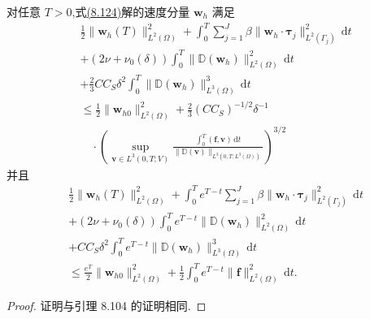 \begin{theorem}[对 $\nu$ 一致的稳定性估计]
\label{thm:smagorinsky-fem-uniform-stability}
对任意 $T>0$,式\hyperref[eq:smagorinsky-continuous-time-fem-problem]{(8.124)}解的速度分量 $\bm{w}_h$ 满足
\begin{equation}\label{eq:smagorinsky-fem-uniform-stability}
\begin{aligned}
 &\frac12\|\bm{w}_h(T)\|_{L^2(\Omega)}^2
 +\int_0^T\sum_{j=1}^J\beta
       \|\bm{w}_h\cdot\symbf{\tau}_j\|_{L^2(\Gamma_j)}^2\,\mathrm{d}t\\
 &+(2\nu+\nu_0(\delta))\int_0^T
       \|\mathbb{D}(\bm{w}_h)\|_{L^2(\Omega)}^2\,\mathrm{d}t\\
 &+\frac23 C C_S\delta^2\int_0^T
       \|\mathbb{D}(\bm{w}_h)\|_{L^3(\Omega)}^3\,\mathrm{d}t\\
 &\le \frac12\|\bm{w}_{h0}\|_{L^2(\Omega)}^2
       +\frac23(CC_S)^{-1/2}\delta^{-1}\\
 &\quad\cdot\left(\sup_{\bm{v}\in L^3(0,T;V)}
       \frac{\int_0^T(\bm{f},\bm{v})\,\mathrm{d}t}
       {\|\mathbb{D}(\bm{v})\|_{L^3(0,T;L^3(\Omega))}}\right)^{3/2}
\end{aligned}
\end{equation}
并且
\begin{equation}\label{eq:smagorinsky-fem-weighted-stability}
\begin{aligned}
 &\frac12\|\bm{w}_h(T)\|_{L^2(\Omega)}^2
 +\int_0^T e^{T-t}\sum_{j=1}^J\beta
       \|\bm{w}_h\cdot\symbf{\tau}_j\|_{L^2(\Gamma_j)}^2\,\mathrm{d}t\\
 &+(2\nu+\nu_0(\delta))\int_0^T e^{T-t}
       \|\mathbb{D}(\bm{w}_h)\|_{L^2(\Omega)}^2\,\mathrm{d}t\\
 &+C C_S\delta^2\int_0^T e^{T-t}
       \|\mathbb{D}(\bm{w}_h)\|_{L^3(\Omega)}^3\,\mathrm{d}t\\
 &\le \frac{e^T}{2}\|\bm{w}_{h0}\|_{L^2(\Omega)}^2
       +\frac12\int_0^T e^{T-t}\|\bm{f}\|_{L^2(\Omega)}^2\,\mathrm{d}t.
\end{aligned}
\end{equation}
\begin{proof}
证明与引理 8.104 的证明相同.
\end{proof}
\end{theorem}

